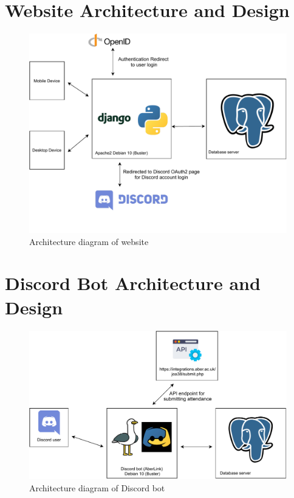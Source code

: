 \section{Website Architecture and Design}
\begin{figure}[H]
	\centering
	\includegraphics[width=1\linewidth]{Figures/Architecture-website}
	\caption{Architecture diagram of website}
	\label{fig:architecture-web}
\end{figure}

\section{Discord Bot Architecture and Design}
\begin{figure}[H]
	\centering
	\includegraphics[width=0.9\linewidth]{Figures/Architecture-discord}
	\caption{Architecture diagram of Discord bot}
	\label{fig:architecture-dis}
\end{figure}

